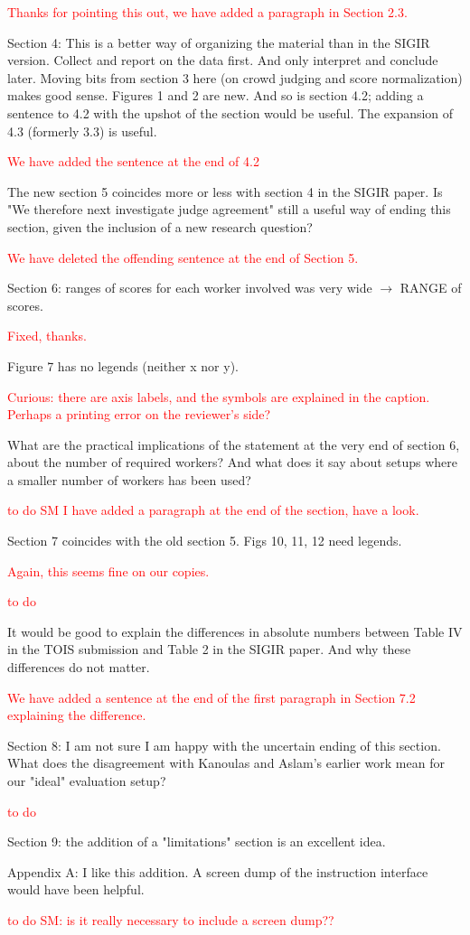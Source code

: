 \documentclass{article}
\newcommand{\comment}[1]{\vspace{1em} \textcolor{red}{{#1}} \vspace{1em}}
\begin{document}
\comment {Thanks for pointing this out, we have added a paragraph in Section 2.3.}

Section 4: This is a better way of organizing the material than in
the SIGIR version. Collect and report on the data first. And only
interpret and conclude later. Moving bits from section 3 here (on
crowd judging and score normalization) makes good sense. Figures 1
and 2 are new. And so is section 4.2; adding a sentence to 4.2 with
the upshot of the section would be useful. The expansion of 4.3
(formerly 3.3) is useful.

\comment {We have added the sentence at the end of 4.2}

The new section 5 coincides more  or less with section 4 in the
SIGIR paper. Is "We therefore next investigate judge agreement"
still a useful  way of ending this section, given the inclusion of
a new research question?

\comment {We have deleted the offending sentence at the end of Section 5.}

Section 6:  ranges of scores for each worker involved was very wide
$\rightarrow$ RANGE of scores. 

\comment {Fixed, thanks.}

Figure 7 has no legends (neither x nor y).

\comment {Curious: there are axis labels, and the symbols are explained
in the caption. Perhaps a printing error on the reviewer's side?} 

What are the practical implications of the statement at the very
end of section 6, about the number of required workers? And what
does it say about setups where a smaller number of workers has been
used?

\comment {to do SM I have added a paragraph at the end of the section, have a look.}

Section 7 coincides with the old section 5. 
Figs 10, 11, 12 need legends. 

\comment {Again, this seems fine on our copies.}

\comment {to do}

It would be good to explain the differences in absolute
numbers between Table IV in the TOIS submission and Table 2 in the
SIGIR paper. And why these differences do not matter.

\comment {We have added a sentence at the end of the first paragraph in Section 7.2 explaining the difference.}

Section 8: I am not sure I am happy with the uncertain ending of
this section. What does the disagreement with Kanoulas and Aslam's
earlier work mean for our "ideal" evaluation setup?

\comment {to do}

Section 9: the addition of a "limitations" section is an excellent
idea.

Appendix A: I like this addition. A screen dump of the instruction
interface would have been helpful.

\comment {to do SM: is it really necessary to include a screen dump??}
\end{document}
